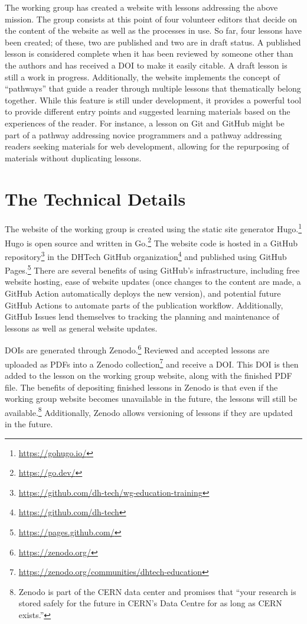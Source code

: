 \documentclass[final]{anthology-ch} %
\begin{document}
The working group has created a website with lessons addressing the above mission. The group consists at this point of four volunteer editors that decide on the content of the website as well as the processes in use. So far, four lessons have been created; of these, two are published and two are in draft status. A published lesson is considered complete when it has been reviewed by someone other than the authors and has received a DOI to make it easily citable. A draft lesson is still a work in progress. Additionally, the website implements the concept of “pathways” that guide a reader through multiple lessons that thematically belong together. While this feature is still under development, it provides a powerful tool to provide different entry points and suggested learning materials based on the experiences of the reader. For instance, a lesson on Git and GitHub might be part of a pathway addressing novice programmers and a pathway addressing readers seeking materials for web development, allowing for the repurposing of materials without duplicating lessons. 


\section{The Technical Details}

The website of the working group is created using the static site generator Hugo.\footnote{\url{https://gohugo.io/}
} Hugo is open source and written in Go.\footnote{\url{https://go.dev/}
} The website code is hosted in a GitHub repository\footnote{\url{https://github.com/dh-tech/wg-education-training}} in the DHTech GitHub organization\footnote{\url{https://github.com/dh-tech}} and published using GitHub Pages.\footnote{\url{https://pages.github.com/}
} There are several benefits of using GitHub’s infrastructure, including free website hosting, ease of website updates (once changes to the content are made, a GitHub Action automatically deploys the new version), and potential future GitHub Actions to automate parts of the publication workflow. Additionally, GitHub Issues lend themselves to tracking the planning and maintenance of lessons as well as general website updates.

DOIs are generated through Zenodo.\footnote{\url{https://zenodo.org/}
} Reviewed and accepted lessons are uploaded as PDFs into a Zenodo collection\footnote{\url{https://zenodo.org/communities/dhtech-education}
} and receive a DOI. This DOI is then added to the lesson on the working group website, along with the finished PDF file. The benefits of depositing finished lessons in Zenodo is that even if the working group website becomes unavailable in the future, the lessons will still be available.\footnote{Zenodo is part of the CERN data center and promises that “your research is stored safely for the future in CERN’s Data Centre for as long as CERN exists.”
} Additionally, Zenodo allows versioning of lessons if they are updated in the future.
\end{document}
